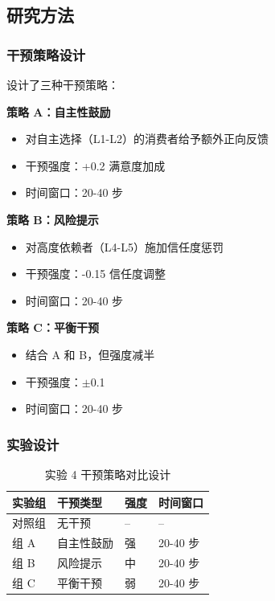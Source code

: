 \documentclass[a4paper,12pt]{article}
\begin{document}
\subsection{研究方法}

\subsubsection{干预策略设计}

设计了三种干预策略：

\textbf{策略 A：自主性鼓励}
\begin{itemize}
    \item 对自主选择（L1-L2）的消费者给予额外正向反馈
    \item 干预强度：+0.2 满意度加成
    \item 时间窗口：20-40 步
\end{itemize}

\textbf{策略 B：风险提示}
\begin{itemize}
    \item 对高度依赖者（L4-L5）施加信任度惩罚
    \item 干预强度：-0.15 信任度调整
    \item 时间窗口：20-40 步
\end{itemize}

\textbf{策略 C：平衡干预}
\begin{itemize}
    \item 结合 A 和 B，但强度减半
    \item 干预强度：$\pm$0.1
    \item 时间窗口：20-40 步
\end{itemize}

\subsubsection{实验设计}

\begin{table}[H]
\centering
\caption{实验 4 干预策略对比设计}
\begin{tabular}{llll}
\toprule
\textbf{实验组} & \textbf{干预类型} & \textbf{强度} & \textbf{时间窗口} \\
\midrule
对照组 & 无干预 & -- & -- \\
组 A & 自主性鼓励 & 强 & 20-40 步 \\
组 B & 风险提示 & 中 & 20-40 步 \\
组 C & 平衡干预 & 弱 & 20-40 步 \\
\bottomrule
\end{tabular}
\end{table}
\end{document}
